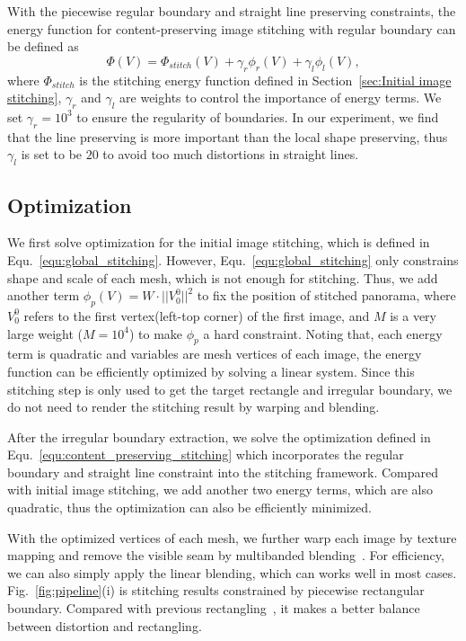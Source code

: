 \documentclass[10pt,journal,compsoc]{IEEEtran}
\begin{document}
With the piecewise regular boundary and straight line preserving constraints,  the energy function for content-preserving image stitching with regular boundary can be defined as
\begin{equation} \label{equ:content_preserving_stitching}
\Phi(V)=\Phi_{stitch}(V)+\gamma_r \phi_r(V)+\gamma_l \phi_l(V),
\end{equation}
where $\Phi_{stitch}$ is the stitching energy function defined in Section~\ref{sec:Initial image stitching}, $\gamma_r$ and $\gamma_l$ are weights to control the importance of energy terms. We set $\gamma_r=10^3$ to ensure the regularity of boundaries.
In our experiment, we find that the line preserving is more important than the local shape preserving, thus $\gamma_l$ is set to be $20$ to avoid too much distortions in straight lines.

\subsection{Optimization}
We first solve optimization for the initial image stitching, which is defined in Equ.~\ref{equ:global_stitching}.
However, Equ.~\ref{equ:global_stitching} only constrains shape and scale of each mesh, which is not enough for stitching.
Thus, we add another term $\phi_p(V)=W\cdot||V_0^0||^2$ to fix the position of stitched panorama, where
$V_0^0$ refers to the first vertex(left-top corner) of the first image, and $M$ is a very large weight ($M=10^4$) to make $\phi_p$ a hard constraint.
Noting that, each energy term is quadratic and variables are mesh vertices of each image, the energy function can be efficiently optimized by solving a linear system.
Since this stitching step is only used to get the target rectangle and irregular boundary, we do not need to render the stitching result by warping and blending.

After the irregular boundary extraction, we solve the optimization defined in Equ.~\ref{equ:content_preserving_stitching} which incorporates the regular boundary and straight line constraint into the stitching framework.
Compared with initial image stitching, we add another two energy terms, which are also quadratic, thus the optimization can also be efficiently minimized.

With the optimized vertices of each mesh, we further warp each image by texture mapping and remove the visible seam by multibanded blending~\cite{journals/tip/ZhuLWZMLH18}.
For efficiency, we can also simply apply the linear blending, which can works well in most cases.
Fig.~\ref{fig:pipeline}(i) is stitching results constrained by piecewise rectangular boundary. Compared with previous rectangling~\cite{journals/tog/HeC013}, it makes a better balance between distortion and rectangling.
\end{document}
